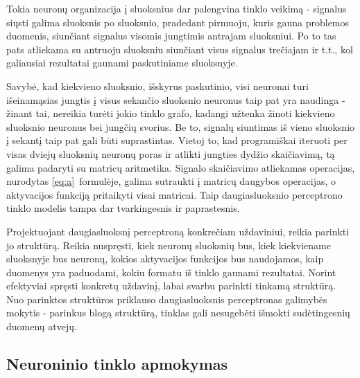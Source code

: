 \documentclass{VUMIFPSbakalaurinis}
\begin{document}
Tokia neuronų organizacija į sluoksnius dar palengvina tinklo veikimą - signalus siųsti galima sluoksnis po sluoksnio, pradedant pirmuoju, kuris gauna problemos duomenis, siunčiant signalus visomis jungtimis antrajam sluoksniui.
Po to tas pats atliekama su antruoju sluoksniu siunčiant visus signalus trečiajam ir t.t., kol galiausiai rezultatai gaunami paskutiniame sluoksnyje.

Savybė, kad kiekvieno sluoksnio, išskyrus paskutinio, visi neuronai turi išeinamąsias jungtis į visus sekančio sluoksnio neuronus taip pat yra naudinga - žinant tai, nereikia turėti jokio tinklo grafo, kadangi užtenka žinoti kiekvieno sluoksnio neuronus bei jungčių svorius.
Be to, signalų siuntimas iš vieno sluoksnio į sekantį taip pat gali būti suprastintas.
Vietoj to, kad programiškai iteruoti per visas dviejų sluoksnių neuronų poras ir atlikti jungties dydžio skaičiavimą, tą galima padaryti su matricų aritmetika.
Signalo skaičiavimo atliekamas operacijas, nurodytas \ref{eq:a}~formulėje, galima sutraukti į matricų daugybos operacijas, o aktyvacijos funkciją pritaikyti visai matricai.
Taip daugiasluoksnio perceptrono tinklo modelis tampa dar tvarkingesnis ir paprastesnis.

Projektuojant daugiasluoksnį perceptroną konkrečiam uždaviniui, reikia parinkti jo struktūrą.
Reikia nuspręsti, kiek neuronų sluoksnių bus, kiek kiekviename sluoksnyje bus neuronų, kokios aktyvacijos funkcijos bus naudojamos, kaip duomenys yra paduodami, kokiu formatu iš tinklo gaunami rezultatai.
Norint efektyviai spręsti konkretų uždavinį, labai svarbu parinkti tinkamą struktūrą.
Nuo parinktos struktūros priklauso daugiasluoksnis perceptronas galimybės mokytis - parinkus blogą struktūrą, tinklas gali nesugebėti išmokti sudėtingesnių duomenų atvejų.



\subsection{Neuroninio tinklo apmokymas} \label{network-learning}

\end{document}
